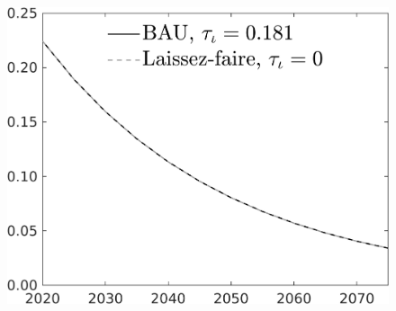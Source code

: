 \documentclass[12pt]{article}
\begin{document}
\begin{figure}[h!!]
\begin{minipage}[]{0.32\textwidth}
	\end{minipage}	
	\begin{minipage}[]{0.32\textwidth}
		\includegraphics[width=1\textwidth]{../../codding_model/own_basedOnFried/optimalPol_010922_revision/figures/all_13Sept22/CompTaul_LFBAU_Reg0_pf_spillover0_nsk1_xgr1_knspil1_sep1_countec0_GovRev0_etaa0.79_lgd1.png}

\end{minipage}
\end{figure}
\end{document}
